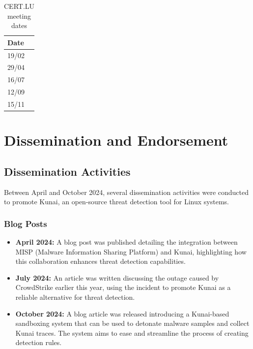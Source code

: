 \begin{table}[H]
    \centering
    \begin{tabular}{l}
    Date\\
    \hline
    19/02\\
    29/04\\
    16/07\\
    12/09\\
    15/11\\
    \end{tabular}
    \caption{CERT.LU meeting dates}
    \label{certlu}
\end{table}

\chapter{Dissemination and Endorsement}

\section*{Dissemination Activities}

Between April and October 2024, several dissemination activities were conducted to promote Kunai, an open-source threat detection tool for Linux systems.

\subsection*{Blog Posts}
\begin{itemize}
    \item \textbf{April 2024:} A blog post was published detailing the integration between MISP (Malware Information Sharing Platform) and Kunai, highlighting how this collaboration enhances threat detection capabilities.
    \item \textbf{July 2024:} An article was written discussing the outage caused by CrowdStrike earlier this year, using the incident to promote Kunai as a reliable alternative for threat detection.
    \item \textbf{October 2024:} A blog article was released introducing a Kunai-based sandboxing system that can be used to detonate malware samples and collect Kunai traces. The system aims to ease and streamline the process of creating detection rules.
\end{itemize}

